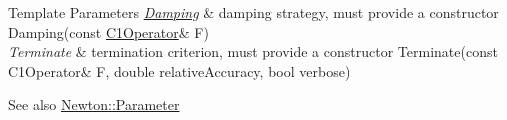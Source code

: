 \begin{DoxyTemplParams}{Template Parameters}
{\em \hyperlink{namespaceSpacy_1_1Newton_1_1Damping}{Damping}} & damping strategy, must provide a constructor Damping(const \hyperlink{classSpacy_1_1C1Operator}{C1\+Operator}\& F) \\
\hline
{\em Terminate} & termination criterion, must provide a constructor Terminate(const C1\+Operator\& F, double relative\+Accuracy, bool verbose)\\
\hline
\end{DoxyTemplParams}
\begin{DoxySeeAlso}{See also}
\hyperlink{structSpacy_1_1Newton_1_1Parameter}{Newton\+::\+Parameter} 
\end{DoxySeeAlso}
